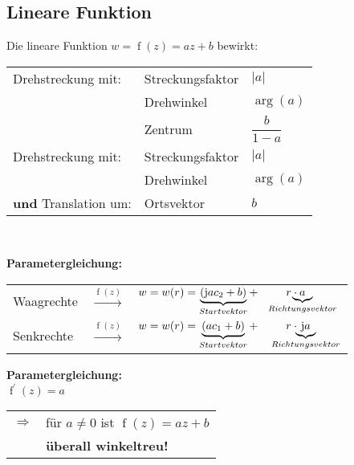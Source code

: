 		\subsection{Lineare Funktion}
			\begin{minipage}[t]{0.5\textwidth}
				
			\end{minipage}
			\begin{minipage}[t]{0.5\textwidth}
				Die lineare Funktion $w = \operatorname{f}\left( z \right) = a z + b$ bewirkt:\\[3pt]
				\renewcommand{\arraystretch}{1.7}
				\begin{tabular}{|lll|}
					\hline
					Drehstreckung mit: & Streckungsfaktor & $\left|a\right|$\\
					 & Drehwinkel & $\operatorname{arg}\left( a \right)$\\
					 & Zentrum & $\dfrac{b}{1-a}$\\[6pt]
					\hline
					Drehstreckung mit: & Streckungsfaktor & $\left|a\right|$\\
					& Drehwinkel & $\operatorname{arg}\left( a \right)$\\
					\textbf{und} Translation um: & Ortsvektor & $b$\\
					\hline
				\end{tabular}
			\renewcommand{\arraystretch}{1}
			\end{minipage}\\[3pt]
			\begin{minipage}[t]{0.7\textwidth}
				\textbf{Parametergleichung:}\\[3pt]
				\begin{tabular}{lcl}
					Waagrechte & $\xrightarrow[]{\operatorname{f}\left( z \right)}$ & $w = w(r) = \underbrace{\left( \mathrm{j} a c_2 + b \right)}_{Startvektor} + \hspace{25pt} r \cdot \hspace{-28pt} \underbrace{a}_{Richtungsvektor}$\\[3pt]
					Senkrechte & $\xrightarrow[]{\operatorname{f}\left( z \right)}$ & $w = w(r) = \underbrace{\left( a c_1 + b \right)}_{Startvektor} + \hspace{25pt} r \cdot \hspace{-25pt} \underbrace{\mathrm{j}a}_{Richtungsvektor}$\\[3pt]
				\end{tabular}
			\end{minipage}
			\begin{minipage}[t]{0.3\textwidth}
				\textbf{Parametergleichung:}\\[3pt]
				$\operatorname{f}^{\prime}\left( z \right) = a$\\[3pt]
				\begin{tabular}{ll}
					$\Rightarrow$ & für $a \neq 0$ ist $\operatorname{f}\left( z \right) = a z + b$\\[3pt]
					 & \textbf{überall winkeltreu!}
				\end{tabular}
			\end{minipage}
		
